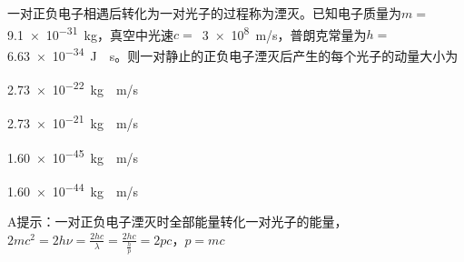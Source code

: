 一对正负电子相遇后转化为一对光子的过程称为湮灭。已知电子质量为\(m =\) \,\qty{9.1e-31}{kg}，真空中光速\(c =\) \,\qty{3e8}{m/s}，普朗克常量为\(h =\)  \,\qty{6.63e-34}{J\cdot s}。则一对静止的正负电子湮灭后产生的每个光子的动量大小为\paren[A]
\begin{choices}
    \item \qty{2.73e-22}{kg\cdot m/s}
    \item \qty{2.73e-21}{kg\cdot m/s}
    \item \qty{1.60e-45}{kg\cdot m/s}
    \item \qty{1.60e-44}{kg\cdot m/s}
\end{choices}
\begin{answer}
    A\qquad 提示：一对正负电子湮灭时全部能量转化一对光子的能量，\(2mc^2 = 2h\nu = \frac{2hc}{\lambda} = \frac{2hc}{\frac{h}{p}} = 2pc\)，\(p = mc\)
\end{answer}